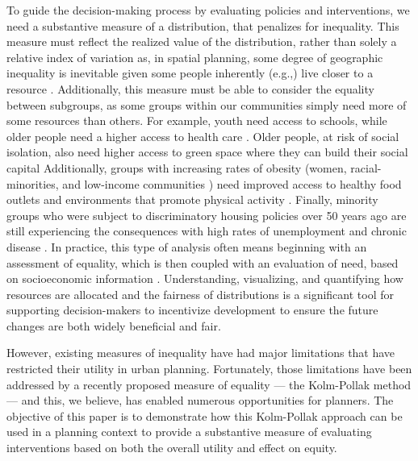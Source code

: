 \documentclass[final,3p,times,onecolumn,sort&compress]{elsarticle}
\begin{document}
To guide the decision-making process by evaluating policies and interventions, we need a substantive measure of a distribution, that penalizes for inequality.
This measure must reflect the realized value of the distribution, rather than solely a relative index of variation as, in spatial planning, some degree of geographic inequality is inevitable given some people inherently (e.g.,) live closer to a resource \citep{Dadashpoor2016-ar, Nesbitt2019-sk}.
Additionally, this measure must be able to consider the equality between subgroups, as some groups within our communities simply need more of some resources than others.
For example, youth need access to schools, while older people need a higher access to health care \citep{Syed2013-aj}.
Older people, at risk of social isolation, also need higher access to green space where they can build their social capital \citep{Frumkin2004-yi}
Additionally, groups with increasing rates of obesity (women, racial-minorities, and low-income communities \citep{Day2006-ak}) need improved access to healthy food outlets \citep{Garcia2020-xt, Kolak2018-az} and environments that promote physical activity \citep{Krenichyn2006-ve}.
Finally, minority groups who were subject to discriminatory housing policies over 50 years ago are still experiencing the consequences with high rates of unemployment and chronic disease \citep{White2020-red}.
In practice, this type of analysis often means beginning with an assessment of equality, which is then coupled with an evaluation of need, based on socioeconomic information \citep{Talen1998-mk, Whitehead2019-tf, Schwarz2015-fs, Harlan2006-ap}.
Understanding, visualizing, and quantifying how resources are allocated and the fairness of distributions is a significant tool for supporting decision-makers to incentivize development to ensure the future changes are both widely beneficial and fair. 

However, existing measures of inequality have had major limitations that have restricted their utility in urban planning. 
Fortunately, those limitations have been addressed by a recently proposed measure of equality --- the Kolm-Pollak method \citep{Sheriff2020-ge} --- and this, we believe, has enabled numerous opportunities for planners.
The objective of this paper is to demonstrate how this Kolm-Pollak approach can be used in a planning context to provide a substantive measure of evaluating interventions based on both the overall utility and effect on equity.
\end{document}

